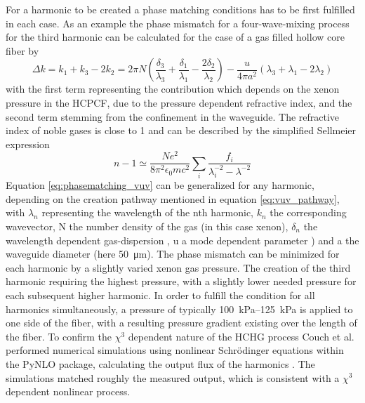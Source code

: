 For a harmonic to be created a phase matching conditions has to be first fulfilled in each case.
As an example the phase mismatch for a four-wave-mixing process for the third harmonic can be calculated for the case of a gas filled hollow core fiber by
\begin{equation}
	\Delta k = k_1 + k_3 - 2k_2 = 2\pi N \left( \frac{\delta_3}{\lambda_3} + \frac{\delta_1}{\lambda_1} - \frac{2\delta_2}{\lambda_2}\right) - \frac{u}{4\pi a^2} (\lambda_3 + \lambda_1 -2\lambda_2)
	\label{eq:phasematching_vuv}
\end{equation}
with the first term representing the contribution which depends on the xenon pressure in the HCPCF, due to the pressure dependent refractive index, and the second term stemming from the confinement in the waveguide.
The refractive index of noble gases is close to 1 and can be described by the simplified Sellmeier expression \cite{bideau-mehu_measurement_1981}
\begin{equation}
	n-1\simeq\frac{Ne^2}{8\pi^2\epsilon_0mc^2}\sum_{i}^{}\frac{f_i}{\lambda_i^{-2}-\lambda^{-2}}
\end{equation}
Equation \ref{eq:phasematching_vuv} can be generalized for any harmonic, depending on the creation pathway mentioned in equation \ref{eq:vuv_pathway}, with $\lambda_n$ representing the wavelength of the nth harmonic, $k_n$ the corresponding wavevector, N the number density of the gas (in this case xenon), $\delta_n$ the wavelength dependent gas-dispersion \cite{bideau-mehu_measurement_1981}, u a mode dependent parameter \cite{couch_ultrafast_2020,durfee_iii_guided-wave_1999}) and a the waveguide diameter (here \qty{50}{\micro\meter}). 
The phase mismatch can be minimized for each harmonic by a slightly varied xenon gas pressure.
The creation of the third harmonic requiring the highest pressure, with a slightly lower needed pressure for each subsequent higher harmonic.
In order to fulfill the condition for all harmonics simultaneously, a pressure of typically \qtyrange{100}{125}{\kilo\pascal} is applied to one side of the fiber, with a resulting pressure gradient existing over the length of the fiber.
To confirm the $\chi^3$ dependent nature of the HCHG process Couch et al. performed numerical simulations using nonlinear Schrödinger equations within the PyNLO package, calculating the output flux of the harmonics \cite{couch_ultrafast_2020,hult_fourth-order_2007,ycas_g_pynlopynlo_2024}.
The simulations matched roughly the measured output, which is consistent with a $\chi^3$ dependent nonlinear process.

